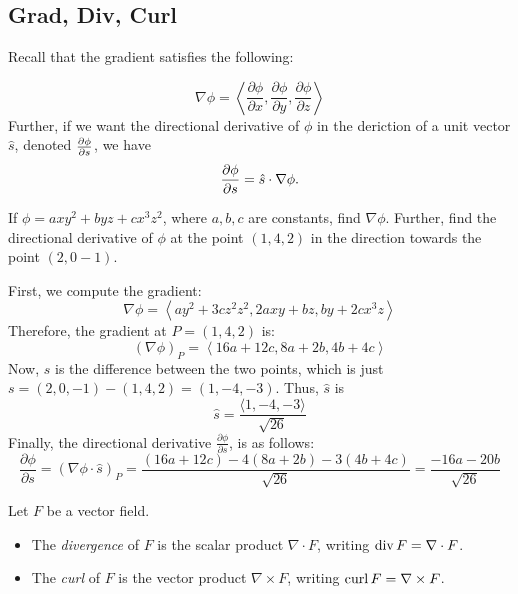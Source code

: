 \subsection{Grad, Div, Curl}

Recall that the gradient satisfies the following:

\begin{proposition}
\[
\nabla \phi = \left\langle\frac{\partial \phi}{\partial x},
\frac{\partial \phi}{\partial y},  \frac{\partial \phi}{\partial z} \right\rangle
\]
Further, if we want the directional derivative of $\phi$ in the deriction of a
unit vector $\hat{s}$, denoted $\frac{\partial \phi}{\partial s}$, we have
\[
\frac{\partial \phi}{\partial s} = \hat{s} \cdot \nabla \phi.
\]
\end{proposition}


\begin{exercise}
    If $\phi = axy^2 + byz + cx^3z^2$, where $a,b,c$ are constants, find $\nabla \phi$. 
    Further, find the directional derivative of $\phi$ at the point $(1,4,2)$ in the 
    direction towards the point $(2,0-1)$.
\end{exercise}
\begin{solution}
    First, we compute the gradient:
    \[
    \nabla \phi = \left\langle ay^2 + 3cz^2z^2, 2axy + bz, by + 2cx^3z \right\rangle
    \]
    Therefore, the gradient at $P = (1,4,2)$ is:
    \[
    (\nabla \phi)_P = \left\langle 16a + 12c, 8a + 2b, 4b + 4c \right\rangle
    \]
    Now, $s$ is the difference between the two points, which is just
     $s = (2,0,-1) - (1,4,2) = (1,-4,-3)$. Thus, $\hat{s}$ is
    \[
    \hat{s} = \frac{\langle 1, -4 , -3\rangle}{\sqrt{26}}
    \]
    Finally, the directional derivative $\frac{\partial \phi}{\partial s}$, is as follows:
    \[
    \frac{\partial \phi}{\partial s} = (\nabla \phi \cdot \hat{s})_P = \frac{(16a + 12c) - 4(8a + 2b) - 3 (4b + 4c)}{\sqrt{26}} = \frac{-16a - 20b}{\sqrt{26}}
    \]
\end{solution}

\begin{df}
    Let $F$ be a vector field.
    \begin{itemize}
        \item The \emph{divergence} of $F$ is the scalar product 
        $\nabla \cdot F$, writing 
        $\operatorname{div} F = \nabla \cdot F$.
        \item The \emph{curl} of $F$ is the vector product 
        $\nabla \times F$, writing $\operatorname{curl} F = \nabla \times F$.
    \end{itemize}
\end{df}

